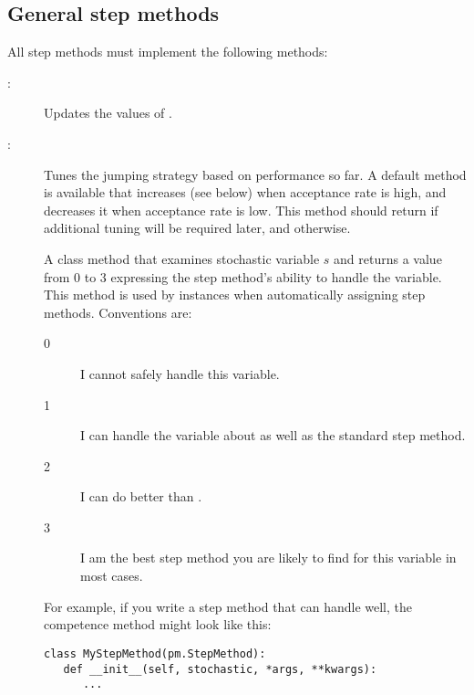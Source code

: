 \subsection{General step methods} \label{user-gen}

All step methods must implement the following methods:
\begin{description}
   \item[:] Updates the values of .
   \item[:] Tunes the jumping strategy based on performance so far. A default method is available that increases  (see below) when acceptance rate is high, and decreases it when acceptance rate is low. This method should return  if additional tuning will be required later, and  otherwise.
   \item[] A class method that examines stochastic variable $s$ and returns a value from 0 to 3 expressing the step method's ability to handle the variable. This method is used by  instances when automatically assigning step methods. Conventions are:
   \begin{description}
      \item[0] I cannot safely handle this variable.
      \item[1] I can handle the variable about as well as the standard  step method.
      \item[2] I can do better than .
      \item[3] I am the best step method you are likely to find for this variable in most cases.
   \end{description}
   For example, if you write a step method that can handle  well, the competence method might look like this:
\begin{verbatim}
class MyStepMethod(pm.StepMethod):
   def __init__(self, stochastic, *args, **kwargs):
      ...


\end{verbatim}
\end{description}
